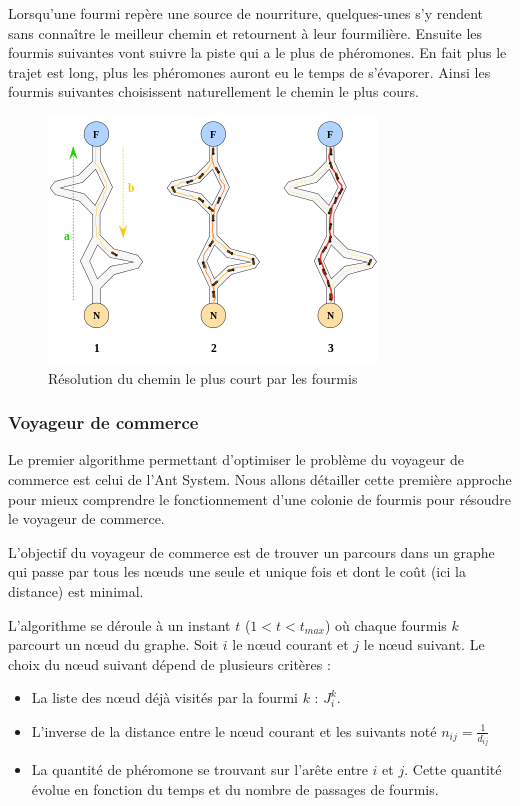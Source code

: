 \documentclass[12pt]{article}
\begin{document}
    Lorsqu'une fourmi repère une source de nourriture, quelques-unes s'y rendent sans connaître le meilleur chemin et retournent à leur fourmilière. Ensuite les fourmis suivantes vont suivre la piste qui a le plus de phéromones. En fait plus le trajet est long, plus les phéromones auront eu le temps de s'évaporer. Ainsi les fourmis suivantes choisissent naturellement le chemin le plus cours.
    
\begin{figure}[H]
	\centering\includegraphics[scale=1]{pisteFourmis.png}
    \caption{Résolution du chemin le plus court par les fourmis}
\end{figure}	



\subsubsection{Voyageur de commerce}
Le premier algorithme permettant d'optimiser le problème du voyageur de commerce est celui de l'Ant System. Nous allons détailler cette première approche pour mieux comprendre le fonctionnement d'une colonie de fourmis pour résoudre le voyageur de commerce.

L'objectif du voyageur de commerce est de trouver un parcours dans un graphe qui passe par tous les nœuds une seule et unique fois et dont le coût (ici la distance) est minimal.

L'algorithme se déroule à un instant $t$ ($1<t<t_{max}$) où chaque fourmis $k$ parcourt un nœud du graphe. Soit $i$ le nœud courant et $j$ le nœud suivant. Le choix du nœud suivant dépend de plusieurs critères :
\begin{itemize}
\item La liste des nœud déjà visités par la fourmi $k$ : $J^k_i$.
\item L'inverse de la distance entre le nœud courant et les suivants noté $n_{ij}=\frac{1}{d_{ij}}$
\item La quantité de phéromone se trouvant sur l'arête entre $i$ et $j$. Cette quantité évolue en fonction du temps et du nombre de passages de fourmis.

\end{itemize}
\end{document}
